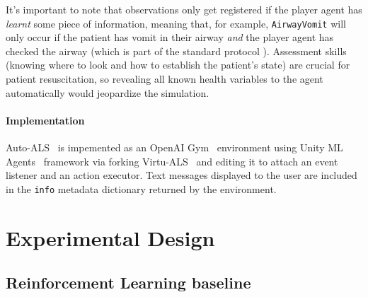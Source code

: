 It's important to note that observations only get registered if the player agent has \emph{learnt} some piece of information, meaning that, for example, \verb|AirwayVomit| will only occur if the patient has vomit in their airway \emph{and} the player agent has checked the airway (which is part of the standard protocol \cite{thimInitialAssessmentTreatment2012}).
Assessment skills (knowing where to look and how to establish the patient's state) are crucial for patient resuscitation, so revealing all known health variables to the agent automatically would jeopardize the simulation.

\paragraph{Implementation}

Auto-ALS~\cite{liventsevVadim0x60Autoals2024} is impemented as an OpenAI Gym~\cite{openai-gym} environment using Unity ML Agents~\cite{almon-manzanoDeepReinforcementLearning2022, julianiUnityGeneralPlatform2020, lanhamLearnUnityMLAgentsfundamentals2018, nandyUnityMLAgents2018} framework via forking Virtu-ALS~\cite{liventsevVadim0x60Virtualsplus2024} and editing it to attach an event listener and an action executor.
Text messages displayed to the user are included in the \texttt{info} metadata dictionary returned by the environment.

\newpage
\section{Experimental Design}
\label{sec:auto-als-exp}

\subsection{Reinforcement Learning baseline}

